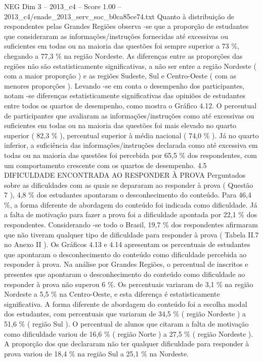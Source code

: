 \begin{textsample}{NEG Dim 3 – 2013\_c4 – Score 1.00 – 2013\_c4/enade\_2013\_serv\_soc\_b0ca85ce74.txt}
Quanto à distribuição de respondentes pelas Grandes Regiões observa -se que a proporção de estudantes que consideraram as informações/instruções fornecidas até excessivas ou suficientes em todas ou na maioria das questões foi sempre superior a 73 \%, chegando a 77,3 \% na região Nordeste.
As diferenças entre as proporções das regiões não são estatisticamente significativas, a não ser entre a região Nordeste ( com a maior proporção ) e as regiões Sudeste, Sul e Centro-Oeste ( com as menores proporções ).
Levando -se em conta o desempenho dos participantes, notam -se diferenças estatisticamente significativas das opiniões de estudantes entre todos os quartos de desempenho, como mostra o Gráfico 4.12.
O percentual de participantes que avaliaram as informações/instruções como até excessivas ou suficientes em todas ou na maioria das questões foi mais elevado no quarto superior ( 82,3 \% ), percentual superior à média nacional ( 74,0 \% ).
Já no quarto inferior, a suficiência das informações/instruções declarada como até excessiva em todas ou na maioria das questões foi percebida por 65,5 \% dos respondentes, com um comportamento crescente com os quartos de desempenho. 4.5 DIFICULDADE ENCONTRADA AO RESPONDER À PROVA Perguntados sobre as dificuldades com as quais se depararam ao responder à prova ( Questão 7 ), 4,8 \% dos estudantes apontaram o desconhecimento do conteúdo.
Para 46,4 \%, a forma diferente de abordagem do conteúdo foi indicada como dificuldade.
Já a falta de motivação para fazer a prova foi a dificuldade apontada por 22,1 \% dos respondentes.
Considerando -se todo o Brasil, 19,7 \% dos respondentes afirmaram que não tiveram qualquer tipo de dificuldade para responder à prova ( Tabela II.7 no Anexo II ).
Os Gráficos 4.13 e 4.14 apresentam os percentuais de estudantes que apontaram o desconhecimento do conteúdo como dificuldade percebida ao responder à prova.
Na análise por Grandes Regiões, o percentual de inscritos e presentes que apontaram o desconhecimento do conteúdo como dificuldade ao responder à prova não superou 6 \%.
Os percentuais variaram de 3,1 \% na região Nordeste a 5,5 \% na Centro-Oeste, e esta diferença é estatisticamente significativa.
A forma diferente de abordagem do conteúdo foi a escolha modal dos estudantes, com percentuais que variaram de 34,5 \% ( região Nordeste ) a 51,6 \% ( região Sul ).
O percentual de alunos que citaram a falta de motivação como dificuldade variou de 16,6 \% ( região Norte ) a 27,5 \% ( região Nordeste ).
A proporção dos que declararam não ter qualquer dificuldade para responder à prova variou de 18,4 \% na região Sul a 25,1 \% na Nordeste.

\end{textsample}
